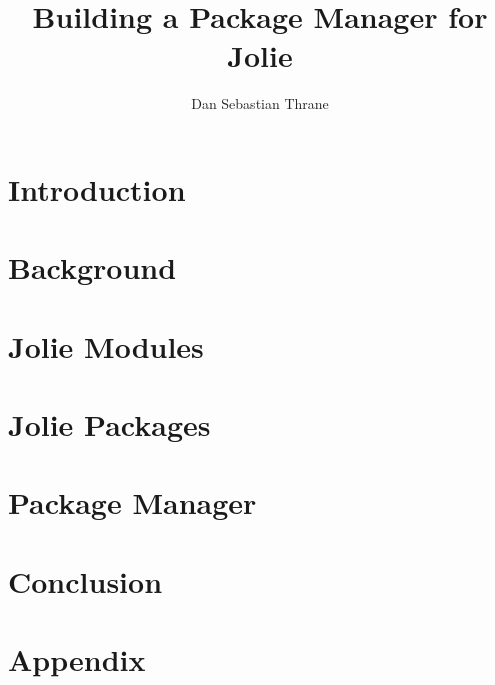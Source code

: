 \documentclass[11pt, a4paper]{report} %
\title{Building a Package Manager for Jolie}
\author{Dan Sebastian Thrane}
\theoremstyle{definition}
\newcommand{\blankpage}{
  \newpage
  \thispagestyle{empty}
  \mbox{}
  \newpage
}
\begin{document}






\tableofcontents

\blankpage

\pagestyle{MyStyle}

\chapter{Introduction}


\chapter{Background}
\label{cha:background}


\chapter{Jolie Modules}


\chapter{Jolie Packages}
\label{cha:packages}


\chapter{Package Manager}
\label{cha:pkg_mngr}


\chapter{Conclusion}
\label{cha:conclusion}


\appendix
\chapter{Appendix}


\printbibliography
\end{document}
